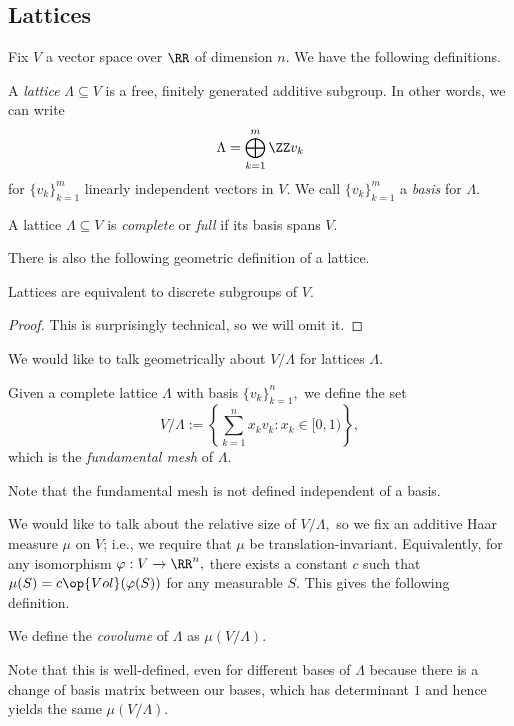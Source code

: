 \documentclass[../notes.tex]{subfiles}
\begin{document}
















\subsection{Lattices}
Fix $V$ a vector space over $\RR$ of dimension $n.$ We have the following definitions.
\begin{definition}[Lattice]
    A \textit{lattice} $\Lambda\subseteq V$ is a free, finitely generated additive subgroup. In other words, we can write
    \[\Lambda=\bigoplus_{k=1}^m\ZZ v_k\]
    for $\{v_k\}_{k=1}^m$ linearly independent vectors in $V.$ We call $\{v_k\}_{k=1}^m$ a \textit{basis} for $\Lambda.$
\end{definition}
\begin{definition}[Complete]
    A lattice $\Lambda\subseteq V$ is \textit{complete} or \textit{full} if its basis spans $V.$
\end{definition}
There is also the following geometric definition of a lattice.
\begin{proposition}
    Lattices are equivalent to discrete subgroups of $V.$
\end{proposition}
\begin{proof}
    This is surprisingly technical, so we will omit it.
\end{proof}
We would like to talk geometrically about $V/\Lambda$ for lattices $\Lambda.$
\begin{definition}
    Given a complete lattice $\Lambda$ with basis $\{v_k\}_{k=1}^n,$ we define the set
    \[V/\Lambda:=\left\{\sum_{k=1}^n x_k v_k:x_k\in[0,1)\right\},\]
    which is the \textit{fundamental mesh} of $\Lambda.$
\end{definition}
Note that the fundamental mesh is not defined independent of a basis.

We would like to talk about the relative size of $V/\Lambda,$ so we fix an additive Haar measure $\mu$ on $V$; i.e., we require that $\mu$ be translation-invariant. Equivalently, for any isomorphism $\varphi:V\to\RR^n,$ there exists a constant $c$ such that $\mu(S)=c\op{Vol}(\varphi(S))$ for any measurable $S.$ This gives the following definition.
\begin{definition}[Covolume]
    We define the \textit{covolume} of $\Lambda$ as $\mu(V/\Lambda).$
\end{definition}
Note that this is well-defined, even for different bases of $\Lambda$ because there is a change of basis matrix between our bases, which has determinant $1$ and hence yields the same $\mu(V/\Lambda).$
\end{document}
